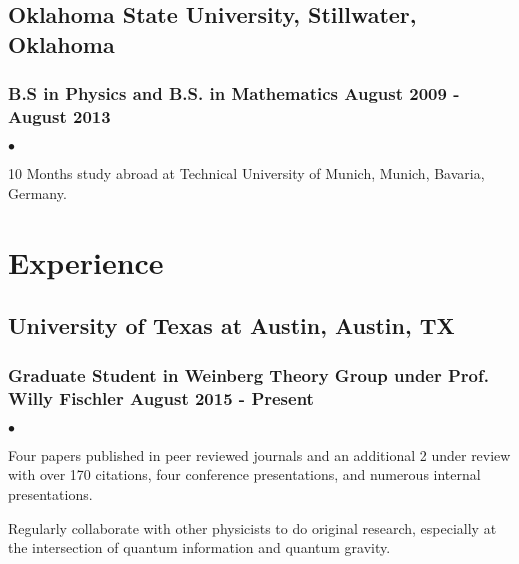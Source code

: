 \documentclass[letterpaper]{article}
\renewenvironment{itemize}{
  \begin{list}{$\bullet$}{
    \setlength{\itemsep}{0em}
    \setlength{\parskip}{0em}
    \setlength{\parsep}{0em} 
    \setlength{\topsep}{0em} 
  }
}{
  \end{list}
}
\begin{document}
\subsection*{Oklahoma State University, Stillwater, Oklahoma}
\subsubsection*{B.S in Physics and B.S. in Mathematics \hfill August 2009 - August 2013}

\begin{itemize}
\item 10 Months study abroad at Technical University of Munich, Munich, Bavaria, Germany.
\end{itemize}

\section*{Experience}

\subsection*{University of Texas at Austin, Austin, TX} 
\subsubsection*{Graduate Student in Weinberg Theory Group under Prof. Willy Fischler \hfill August 2015 - Present}
    \begin{itemize}
    
        \item Four papers published in peer reviewed journals and an additional 2 under review with over 170 citations, four conference presentations, and numerous internal presentations.
        \item Regularly collaborate with other physicists to do original research, especially at the intersection of quantum information and quantum gravity.
        
    \end{itemize}
    
\end{document}
